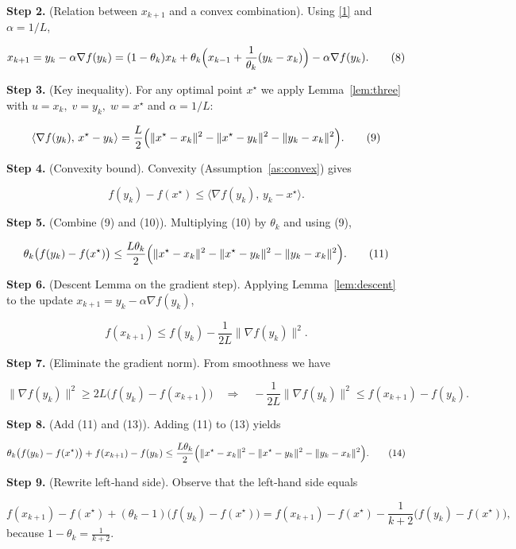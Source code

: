 \documentclass{article}
\begin{document}
\noindent\textbf{Step 2.} (Relation between \(x_{k+1}\) and a convex combination).  
Using \eqref{1} and \(\alpha=1/L\),

\[
x_{k+1}= y_k-\alpha\nabla f(y_k)
       = (1-\theta_k)x_k+\theta_k\Bigl(x_{k-1}+\frac{1}{\theta_k}(y_k-x_k)\Bigr)
       -\alpha\nabla f(y_k).
\tag{8}
\]

\noindent\textbf{Step 3.} (Key inequality).  
For any optimal point \(x^\star\) we apply Lemma~\ref{lem:three} with  
\(u=x_k,\; v=y_k,\; w=x^\star\) and \(\alpha=1/L\):

\[
\langle \nabla f(y_k),\,x^\star-y_k\rangle
= \frac{L}{2}\Bigl(\|x^\star-x_k\|^{2}-\|x^\star-y_k\|^{2}-\|y_k-x_k\|^{2}\Bigr).
\tag{9}
\]

\noindent\textbf{Step 4.} (Convexity bound).  
Convexity (Assumption~\ref{as:convex}) gives

\[
f(y_k)-f(x^\star)\le \langle \nabla f(y_k),\,y_k-x^\star\rangle .
\tag{10}
\]

\noindent\textbf{Step 5.} (Combine (9) and (10)).  
Multiplying (10) by \(\theta_k\) and using (9),

\[
\theta_k\bigl(f(y_k)-f(x^\star)\bigr)
\le \frac{L\theta_k}{2}\Bigl(\|x^\star-x_k\|^{2}
      -\|x^\star-y_k\|^{2}-\|y_k-x_k\|^{2}\Bigr).
\tag{11}
\]

\noindent\textbf{Step 6.} (Descent Lemma on the gradient step).  
Applying Lemma~\ref{lem:descent} to the update \(x_{k+1}=y_k-\alpha\nabla f(y_k)\),

\[
f(x_{k+1})\le f(y_k)-\frac{1}{2L}\|\nabla f(y_k)\|^{2}.
\tag{12}
\]

\noindent\textbf{Step 7.} (Eliminate the gradient norm).  
From smoothness we have  

\[
\|\nabla f(y_k)\|^{2}\ge 2L\bigl(f(y_k)-f(x_{k+1})\bigr)
\quad\Longrightarrow\quad
-\frac{1}{2L}\|\nabla f(y_k)\|^{2}\le f(x_{k+1})-f(y_k).
\tag{13}
\]

\noindent\textbf{Step 8.} (Add (11) and (13)).  
Adding (11) to (13) yields

\[
\theta_k\bigl(f(y_k)-f(x^\star)\bigr)+f(x_{k+1})-f(y_k)
\le \frac{L\theta_k}{2}\Bigl(\|x^\star-x_k\|^{2}
      -\|x^\star-y_k\|^{2}-\|y_k-x_k\|^{2}\Bigr).
\tag{14}
\]

\noindent\textbf{Step 9.} (Rewrite left‑hand side).  
Observe that the left‑hand side equals  

\[
f(x_{k+1})-f(x^\star)+(\theta_k-1)\bigl(f(y_k)-f(x^\star)\bigr)
= f(x_{k+1})-f(x^\star)-\frac{1}{k+2}\bigl(f(y_k)-f(x^\star)\bigr),
\tag{15}
\]
because \(1-\theta_k = \frac{1}{k+2}\).
\end{document}
